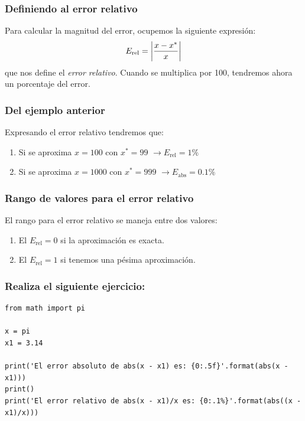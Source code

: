 \documentclass[12pt]{beamer}
\begin{document}
\begin{frame}
\frametitle{Definiendo al error relativo}
Para calcular la magnitud del error, ocupemos la siguiente expresión:
\pause
\begin{align*}
E_{\text{rel}} = \abs{\dfrac{x - x^{*}}{x}}
\end{align*}
que nos define el \emph{error relativo}. \pause Cuando se multiplica por 100, tendremos ahora un porcentaje del error.
\end{frame}
\begin{frame}
\frametitle{Del ejemplo anterior}
Expresando el error relativo tendremos que:
\pause
{}
\begin{enumerate}[<+->]
\item Si se aproxima $x = 100$ con $x^{*} = 99$ \pause $\to E_{\text{rel}} = 1\%$ \pause
\item Si se aproxima $x = 1000$ con $x^{*} = 999$ \pause $\to E_{\text{abs}} = 0.1\%$
\end{enumerate}
\end{frame}    
\begin{frame}
\frametitle{Rango de valores para el error relativo}
El rango para el error relativo se maneja entre dos valores:
\pause
{}
\begin{enumerate}[<+->]
\item El $E_{\text{rel}} = 0$ si la aproximación es exacta.
\item El $E_{\text{rel}} = 1$ si tenemos una pésima aproximación.
\end{enumerate}
\end{frame}
\begin{frame}[fragile]
\frametitle{Realiza el siguiente ejercicio:}
\begin{lstlisting}[caption=Obteniendo errores absoluto y relativo]
from math import pi

x = pi
x1 = 3.14

print('El error absoluto de abs(x - x1) es: {0:.5f}'.format(abs(x - x1)))
print()
print('El error relativo de abs(x - x1)/x es: {0:.1%}'.format(abs((x - x1)/x)))
\end{lstlisting}
\end{frame}
\end{document}
